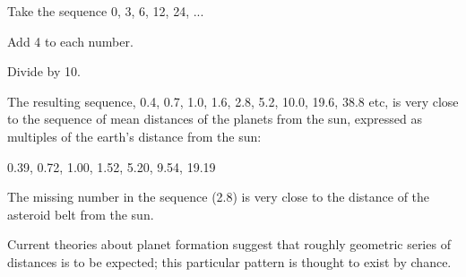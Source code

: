 Take the sequence 0, 3, 6, 12, 24, ...
\par
Add 4 to each number.
\par
Divide by 10.
\par
The resulting sequence, 0.4, 0.7, 1.0, 1.6, 2.8, 5.2, 10.0, 19.6, 38.8 
etc, is very close to the sequence of mean distances of the planets 
from the sun, expressed as multiples of the earth's distance from the sun:
\par
0.39, 0.72, 1.00, 1.52, 5.20, 9.54, 19.19
\par
The missing number in the sequence (2.8) is very close to the distance of
the asteroid belt from the sun.
\par
Current theories about planet formation suggest that roughly geometric
series of distances is to be expected; this particular pattern is thought
to exist by chance.